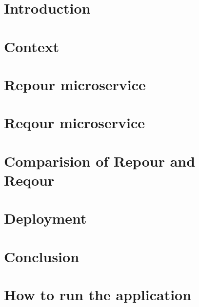 \documentclass[
  digital,     %
  oneside,     %
  nosansbold,  %
  nocolorbold, %
  nolof,         %
  nolot,         %
]{fithesis4}
\begin{document}
\chapter*{Introduction}
\label{chap:introduction}


\chapter{Context}
\label{chap:context}


\chapter{Repour microservice}
\label{chap:repour}


\chapter{Reqour microservice}
\label{chap:reqour}


\chapter{Comparision of Repour and Reqour}
\label{chap:comparision}


\chapter{Deployment}
\label{chap:deployment}


\chapter*{Conclusion}
\label{chap:conclusion}



\printbibliography


\appendix

\chapter{How to run the application}

\end{document}
